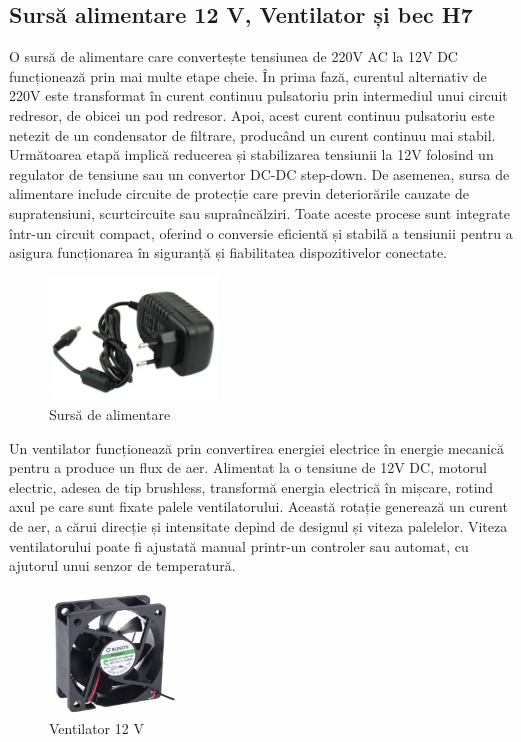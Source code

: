 \subsection{Sursă alimentare 12 V, Ventilator și bec H7}
O sursă de alimentare care convertește tensiunea de 220V AC la 12V DC funcționează prin mai multe etape cheie. În prima fază, curentul alternativ de 220V este transformat în curent continuu pulsatoriu prin intermediul unui circuit redresor, de obicei un pod redresor. Apoi, acest curent continuu pulsatoriu este netezit de un condensator de filtrare, producând un curent continuu mai stabil. Următoarea etapă implică reducerea și stabilizarea tensiunii la 12V folosind un regulator de tensiune sau un convertor DC-DC step-down. De asemenea, sursa de alimentare include circuite de protecție care previn deteriorările cauzate de supratensiuni, scurtcircuite sau supraîncălziri. Toate aceste procese sunt integrate într-un circuit compact, oferind o conversie eficientă și stabilă a tensiunii pentru a asigura funcționarea în siguranță și fiabilitatea dispozitivelor conectate.

\begin{figure}[H]
\includegraphics[width=0.4\textwidth, height=0.3\textwidth]{images/sursa.png}
\caption{Sursă de alimentare\cite{sursa_poza}}
\label{fig:sursa}
\end{figure}

Un ventilator funcționează prin convertirea energiei electrice în energie mecanică pentru a produce un flux de aer. Alimentat la o tensiune de 12V DC, motorul electric, adesea de tip brushless, transformă energia electrică în mișcare, rotind axul pe care sunt fixate palele ventilatorului. Această rotație generează un curent de aer, a cărui direcție și intensitate depind de designul și viteza palelelor. Viteza ventilatorului poate fi ajustată manual printr-un controler sau automat, cu ajutorul unui senzor de temperatură.

\begin{figure}[H]
\includegraphics[width=0.3\textwidth, height=0.3\textwidth]{images/ventilator.png}
\caption{Ventilator 12 V\cite{vent_poza}}
\label{fig:ventilator}
\end{figure}

